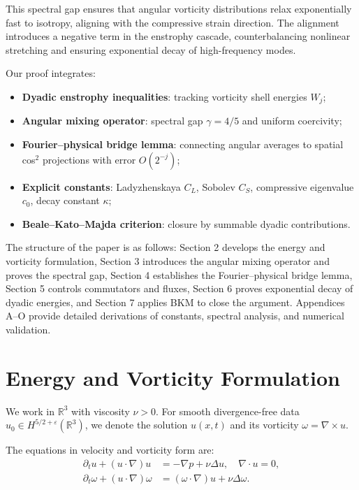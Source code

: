 \documentclass[11pt]{article}
\begin{document}
This spectral gap ensures that angular vorticity distributions relax exponentially fast to isotropy, aligning with the compressive strain direction. The alignment introduces a negative term in the enstrophy cascade, counterbalancing nonlinear stretching and ensuring exponential decay of high-frequency modes.

Our proof integrates:
\begin{itemize}
    \item \textbf{Dyadic enstrophy inequalities}: tracking vorticity shell energies $W_j$;
    \item \textbf{Angular mixing operator}: spectral gap $\gamma=4/5$ and uniform coercivity;
    \item \textbf{Fourier--physical bridge lemma}: connecting angular averages to spatial cos$^2$ projections with error $O(2^{-j})$;
    \item \textbf{Explicit constants}: Ladyzhenskaya $C_L$, Sobolev $C_S$, compressive eigenvalue $c_0$, decay constant $\kappa$;
    \item \textbf{Beale--Kato--Majda criterion}: closure by summable dyadic contributions.
\end{itemize}

The structure of the paper is as follows: Section 2 develops the energy and vorticity formulation, Section 3 introduces the angular mixing operator and proves the spectral gap, Section 4 establishes the Fourier--physical bridge lemma, Section 5 controls commutators and fluxes, Section 6 proves exponential decay of dyadic energies, and Section 7 applies BKM to close the argument. Appendices A--O provide detailed derivations of constants, spectral analysis, and numerical validation. \section{Energy and Vorticity Formulation}

We work in $\mathbb{R}^3$ with viscosity $\nu > 0$. For smooth divergence-free data $u_0 \in H^{5/2+\varepsilon}(\mathbb{R}^3)$, we denote the solution $u(x,t)$ and its vorticity $\omega = \nabla \times u$.  

The equations in velocity and vorticity form are:
\begin{align}
\partial_t u + (u \cdot \nabla) u &= -\nabla p + \nu \Delta u, \quad \nabla \cdot u = 0, \tag{2.1} \\
\partial_t \omega + (u \cdot \nabla) \omega &= (\omega \cdot \nabla) u + \nu \Delta \omega. \tag{2.2}
\end{align}
\end{document}

